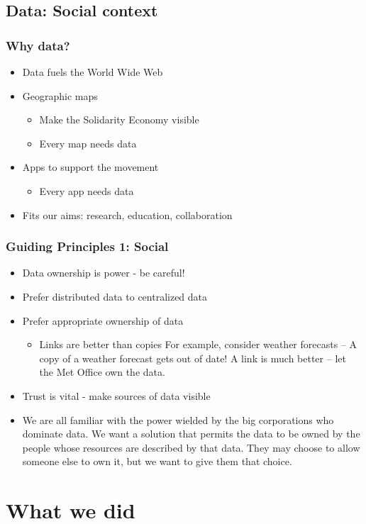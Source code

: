 \subsection{Data: Social context}
\frame
{
  \frametitle{Why data?}
  \begin{itemize}
    \item<1-> Data fuels the World Wide Web
    \item<2-> Geographic maps
      \begin{itemize}
	\item Make the Solidarity Economy visible
	\item Every map needs data
      \end{itemize}
    \item<3-> Apps to support the movement
      \begin{itemize}
	\item Every app needs data
      \end{itemize}
    \item<4-> Fits our aims: research, education, collaboration
  \end{itemize}
}
\frame
{
  \frametitle{Guiding Principles 1: Social}
  \begin{itemize}
    \item Data ownership is power - be careful!
    \item Prefer distributed data to centralized data
    \item Prefer appropriate ownership of data
      \begin{itemize}
	\item Links are better than copies
	  \only<article> {For example, consider weather forecasts --
	  A copy of a weather forecast gets out of date!
	  A link is much better -- let the Met Office own the data.}
      \end{itemize}
    \item Trust is vital - make sources of data visible
    \item<article> We are all familiar with the power wielded by the big corporations who dominate data.
      We want a solution that permits the data to be owned by the people whose resources are described by that data.
      They may choose to allow someone else to own it, but we want to give them that choice.
  \end{itemize}
}
\section{What we did}
